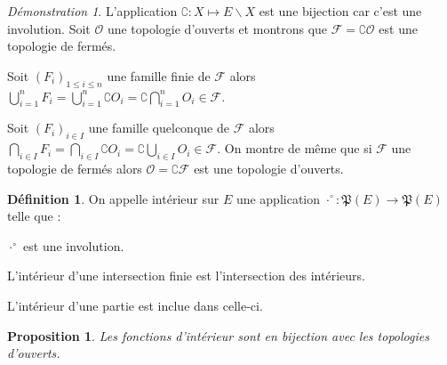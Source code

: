 \documentclass[a4paper, 11pt, french]{book}
\newenvironment{itemise}{\itemize}{\enditemize}
\theoremstyle{plain} %
\newtheorem{proposition}{Proposition}
\theoremstyle{definition} %
\newtheorem{definition}{Définition}
\theoremstyle{remark} %
\newtheorem*{demonstration}{Démonstration}
\renewcommand{\setminus}{\backslash}
\newcommand{\1}{\mathds{1}}
\renewcommand{\frak}[1]{\mathfrak{#1}}
\newcommand{\scr}[1]{\mathscr{#1}}
\begin{document}
\begin{demonstration}
	L'application $\complement\colon X\longmapsto E\setminus X$ est une bijection car c'est une involution.
	Soit $\scr{O}$ une topologie d'ouverts et montrons que $\scr{F}=\complement\scr{O}$ est une topologie de fermés.
	\begin{itemise}
		\item Soit $(F_i)_{1\leqslant i\leqslant n}$ une famille finie de $\scr{F}$ alors
		$\bigcup_{i=1}^nF_i=\bigcup_{i=1}^n\complement O_i=\complement\bigcap_{i=1}^nO_i\in\scr{F}$.
		\item Soit $(F_i)_{i\in I}$ une famille quelconque de $\scr{F}$ alors
		$\bigcap_{i\in I}F_i=\bigcap_{i\in I}\complement O_i=\complement\bigcup_{i\in I}O_i\in\scr{F}$.
	\end{itemise}
	On montre de même que si $\scr{F}$ une topologie de fermés alors $\scr{O}=\complement\scr{F}$ est une topologie d'ouverts.
\end{demonstration}

\begin{definition}
	On appelle intérieur sur $E$ une application $\cdot^\circ\colon\frak{P}(E)\rightarrow\frak{P}(E)$ telle que :
	\begin{itemise}
		\item $\cdot^\circ$ est une involution.
		\item L'intérieur d'une intersection finie est l'intersection des intérieurs.
		\item L'intérieur d'une partie est inclue dans celle-ci.
	\end{itemise}
\end{definition}

\begin{proposition}
	Les fonctions d'intérieur sont en bijection avec les topologies d'ouverts.
\end{proposition}
\end{document}
